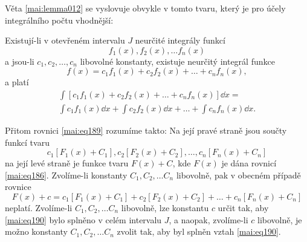       Věta \eqref{mai:lemma012} se vyslovuje obvykle v tomto tvaru, který je pro účely integrálního
      počtu vhodnější:
      \begin{mdframed}[style=mdmathlemma]
        \begin{lemma}\label{mai:lemma013}        
          Existují-li v otevřeném intervalu \(J\) neurčité integrály funkcí
          \begin{equation}\label{mai:eq191}
            f_1(x), f_2(x), \ldots f_n(x) 
          \end{equation}
          a jsou-li \(c_1, c_2, \ldots, c_n\) libovolné konstanty, existuje  neurčitý integrál
          funkce  
          \begin{equation}\label{mai:eq188}
            f(x) = c_1f_1(x) + c_2f_2(x) + \ldots + c_nf_n(x),
          \end{equation}
          a platí
          \begin{equation}\label{mai:eq189}
            \begin{multlined}
              \int[c_1f_1(x) + c_2f_2(x) + \ldots + c_nf_n(x)]\dd{x}  =    \\   
              \int{c_1f_1(x)}\dd{x} + \int{c_2f_2(x)}\dd{x} + \ldots + \int{c_nf_n(x)}\dd{x}.
            \end{multlined}
          \end{equation}
        \end{lemma}
      \end{mdframed}
      Přitom rovnici \eqref{mai:eq189} rozumíme takto: Na její pravé straně jsou součty funkcí tvaru
      \begin{equation*}
        c_1[F_1(x) + C_1], c_2[F_2(x) + C_2], \ldots, c_n[F_n(x) + C_n]
      \end{equation*}
      na její levé straně je funkce tvaru \(F(x)+C\), kde \(F(x)\) je dána rovnicí
      \eqref{mai:eq186}. Zvolíme-li konstanty \(C_1, C_2, \ldots C_n\) libovolně, pak v obecném
      případě rovnice 
      \begin{equation}\label{mai:eq190}
        F(x) + c = c_1[F_1(x) + C_1] + c_2[F_2(x) + C_2] + \ldots + c_n[F_n(x) + C_n]
      \end{equation}     
      neplatí. Zvolíme-li \(C_1, C_2, \ldots C_n\) libovolně, lze konstantu \(c\) určit tak, aby
      \eqref{mai:eq190} bylo splněno v celém intervalu \(J\), a naopak, zvolíme-li \(c\) libovolně,
      je možno konstanty \(C_1, C_2, \ldots C_n\) zvolit tak, aby byl splněn vztah
      \eqref{mai:eq190}. 

